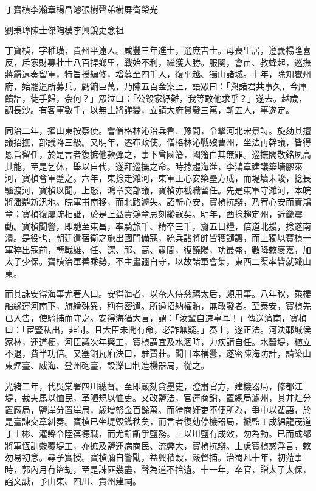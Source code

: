
\begin{pinyinscope}
丁寶楨李瀚章楊昌濬張樹聲弟樹屏衛榮光

劉秉璋陳士傑陶模李興銳史念祖

丁寶楨，字稚璜，貴州平遠人。咸豐三年進士，選庶吉士。母喪里居，遵義楊隆喜反，斥家財募壯士八百捍鄉里，戰始不利，繼獲大勝。服闋，會苗、教蜂起，巡撫蔣霨遠奏留軍，特旨授編修，增募至四千人，復平越、獨山諸城。十年，除知嶽州府，始罷遣所募兵。虧餉巨萬，乃陳五百金案上，語眾曰：「與諸君共事久，今庫饋詘，徒手歸，奈何？」眾泣曰：「公毀家紓難，我等敢他求乎？」遂去。越歲，調長沙。有客軍數千，以無主將譁變，立請大府貸發三萬，斬五人，事遂定。

同治二年，擢山東按察使。會僧格林沁治兵魯、豫間，令擊河北宋景詩。旋劾其擅議招撫，部議降三級。又明年，遷布政使。僧格林沁戰歿曹州，坐法再幹議，皆得恩旨留任，於是言者復摭他款彈之，事下曾國籓，國籓白其無罪。巡撫閻敬銘夙高其能，至是乞休，舉以自代，遂拜巡撫之命。時捻趨海澨，李鴻章建議築墻膠萊河，寶楨會軍蹙之。六年，東捻走濰河，東軍王心安築壘方成，而堤墻未竣，捻長驅渡河，寶楨以聞。上怒，鴻章交部議，寶楨亦褫職留任。先是東軍守濰河，本皖將潘鼎新汛地。皖軍甫南移，而北路遽失。詔斬心安，寶楨抗辯，乃宥心安而責鴻章；寶楨復屢疏相詆，於是上益責鴻章忌刻縱寇矣。明年，西捻趨定州，近畿震動。寶楨聞警，即馳至東昌，率騎旅千、精卒三千，齎五日糧，倍道北援，捻遂南潰。是役也，朝廷遣宿衛之旅出國門備寇，統兵諸將帥皆獲譴讓，而上獨以寶楨一軍猝出寇前，轉戰雄、任、深、祁、高、肅間，復饒陽，功最盛，數降敕褒嘉，加太子少保。寶楨治軍善乘勢，不主畫疆自守，以故諸軍會集，東西二渠率皆就殲山東。

而其誅安得海事尤著人口。安得海者，以奄人侍慈禧太后，頗用事。八年秋，乘樓船緣運河南下，旗繒殊異，稱有密遣。所過招納權賄，無敢發者。至泰安，寶楨先已入告，使騎捕而守之。安得海猶大言，謂：「汝輩自速辜耳！」傳送濟南，寶楨曰：「宦豎私出，非制。且大臣未聞有命，必詐無疑。」奏上，遂正法。河決鄆城侯家林，運道梗，河臣議次年興工，寶楨謂宜及水涸時，力疾請自任。水齧堤，植立不退，費半功倍。又塞銅瓦廂決口，駐賈莊。聞日本構釁，遂密陳海防計，請築山東煙臺、威海、登州砲臺，設濼口制造機器局，從之。

光緒二年，代吳棠署四川總督。至即嚴劾貪墨吏，澄肅官方，建機器局，修都江堤，裁夫馬以恤民，革陋規以恤吏。又改鹽法，官運商銷，置總局瀘州，其井灶分置廠局，鹽岸分置岸局，歲增帑金百餘萬。而猾商奸吏不便所為，爭中以蜚語，於是臺諫交章糾奏。寶楨已坐堤毀鐫秩矣，而言者復劾停機器局，褫監工成綿龍茂道丁士彬、灌縣令陸葆德職，而尤齗齗爭鹽務。上以川鹽有成效，勿為動。已而成都將軍恆訓覈覆堤工，亦摭及鹽運病商民、流弊大，寶楨抗辯。上慮寶楨惑浮言，敕勿易初念。尋予實授。寶楨彌自警勖，益興積穀，嚴督捕。治蜀凡十年，初蒞事時，郭內月有盜劫，至是誅匪幾盡，聲為道不拾遺。十一年，卒官，贈太子太保，謚文誠，予山東、四川、貴州建祠。


\end{pinyinscope}
